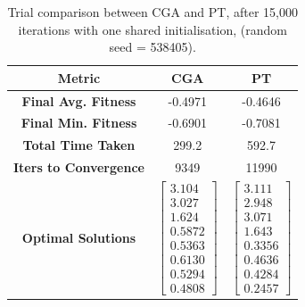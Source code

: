 \documentclass[10pt]{article}
\begin{document}
\begin{multicols}{2}
\begin{table}[H]
    \centering
    \begin{tabular}{|c|c|c|}
    \hline
    \textbf{Metric} & \textbf{CGA} & \textbf{PT} \\
    \hline
    \textbf{Final Avg. Fitness} & -0.4971 & -0.4646 \\
    \hline
    \textbf{Final Min. Fitness} & -0.6901 & -0.7081 \\
    \hline
    \textbf{Total Time Taken} & 299.2 & 592.7 \\
    \hline
    \textbf{Iters to Convergence} & 9349 & 11990 \\
    \hline
    \textbf{Optimal Solutions} & $\begin{bmatrix} 3.104 \\ 3.027 \\ 1.624 \\ 0.5872 \\ 0.5363 \\ 0.6130 \\ 0.5294 \\ 0.4808 \end{bmatrix}$ & $\begin{bmatrix} 3.111 \\ 2.948 \\ 3.071 \\ 1.643 \\ 0.3356 \\ 0.4636 \\ 0.4284 \\ 0.2457 \end{bmatrix}$ \\
    \hline
    \end{tabular}
    \captionsetup{justification=centering}
    \caption{Trial comparison between CGA and PT, after 15,000 iterations with one shared initialisation, (random seed = 538405).}
    \label{tab:trial_comparison}
\end{table}


\end{multicols}
\end{document}
